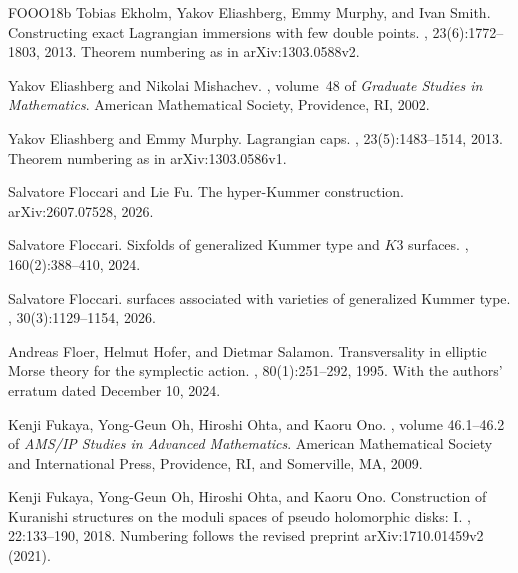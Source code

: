 \documentclass[11pt]{article}
\numberwithin{equation}{section}
\theoremstyle{definition}
\theoremstyle{remark}
\begin{document}
\begin{thebibliography}{FOOO18b}
Tobias Ekholm, Yakov Eliashberg, Emmy Murphy, and Ivan Smith.
\newblock Constructing exact {Lagrangian} immersions with few double points.
, 23(6):1772--1803, 2013.
\newblock Theorem numbering as in arXiv:1303.0588v2.

Yakov Eliashberg and Nikolai Mishachev.
, volume~48 of {\em Graduate
  Studies in Mathematics}.
\newblock American Mathematical Society, Providence, RI, 2002.

Yakov Eliashberg and Emmy Murphy.
\newblock Lagrangian caps.
, 23(5):1483--1514, 2013.
\newblock Theorem numbering as in arXiv:1303.0586v1.

Salvatore Floccari and Lie Fu.
\newblock The hyper-{Kummer} construction.
\newblock arXiv:2607.07528, 2026.

Salvatore Floccari.
\newblock Sixfolds of generalized {Kummer} type and {$K3$} surfaces.
, 160(2):388--410, 2024.

Salvatore Floccari.
 surfaces associated with varieties of generalized {Kummer}
  type.
, 30(3):1129--1154, 2026.

Andreas Floer, Helmut Hofer, and Dietmar Salamon.
\newblock Transversality in elliptic {Morse} theory for the symplectic action.
, 80(1):251--292, 1995.
\newblock With the authors' erratum dated December 10, 2024.

Kenji Fukaya, Yong-Geun Oh, Hiroshi Ohta, and Kaoru Ono.
, volume 46.1--46.2 of {\em AMS/IP Studies in Advanced
  Mathematics}.
\newblock American Mathematical Society and International Press, Providence,
  RI, and Somerville, MA, 2009.

Kenji Fukaya, Yong-Geun Oh, Hiroshi Ohta, and Kaoru Ono.
\newblock Construction of {Kuranishi} structures on the moduli spaces of pseudo
  holomorphic disks: {I}.
, 22:133--190, 2018.
\newblock Numbering follows the revised preprint arXiv:1710.01459v2 (2021).


\end{thebibliography}
\end{document}
